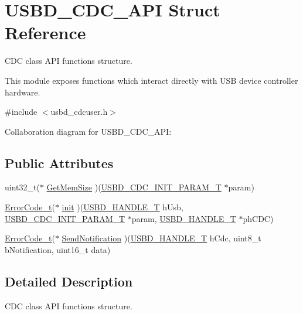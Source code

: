 \hypertarget{structUSBD__CDC__API}{}\section{U\+S\+B\+D\+\_\+\+C\+D\+C\+\_\+\+A\+PI Struct Reference}
\label{structUSBD__CDC__API}


C\+DC class A\+PI functions structure.

This module exposes functions which interact directly with U\+SB device controller hardware.  




{\ttfamily \#include $<$usbd\+\_\+cdcuser.\+h$>$}



Collaboration diagram for U\+S\+B\+D\+\_\+\+C\+D\+C\+\_\+\+A\+PI\+:
\subsection*{Public Attributes}
\begin{DoxyCompactItemize}
\item 
uint32\+\_\+t($\ast$ \hyperlink{structUSBD__CDC__API_abde21c25f0b02b4d3ec9af0e41378437}{Get\+Mem\+Size} )(\hyperlink{group__USBD__CDC_ga78b2c5f20653181161c59062795233b3}{U\+S\+B\+D\+\_\+\+C\+D\+C\+\_\+\+I\+N\+I\+T\+\_\+\+P\+A\+R\+A\+M\+\_\+T} $\ast$param)
\item 
\hyperlink{error_8h_a905255056c349318139d94aa4523d516}{Error\+Code\+\_\+t}($\ast$ \hyperlink{structUSBD__CDC__API_a3c3f8725643c607bca1cf3f422dc5702}{init} )(\hyperlink{group__USBD__Core_gafdbb2204d929cb9d75736bd2b42342ac}{U\+S\+B\+D\+\_\+\+H\+A\+N\+D\+L\+E\+\_\+T} h\+Usb, \hyperlink{group__USBD__CDC_ga78b2c5f20653181161c59062795233b3}{U\+S\+B\+D\+\_\+\+C\+D\+C\+\_\+\+I\+N\+I\+T\+\_\+\+P\+A\+R\+A\+M\+\_\+T} $\ast$param, \hyperlink{group__USBD__Core_gafdbb2204d929cb9d75736bd2b42342ac}{U\+S\+B\+D\+\_\+\+H\+A\+N\+D\+L\+E\+\_\+T} $\ast$ph\+C\+DC)
\item 
\hyperlink{error_8h_a905255056c349318139d94aa4523d516}{Error\+Code\+\_\+t}($\ast$ \hyperlink{structUSBD__CDC__API_a39f1af8073c7e98a7a96ac68e612e7fe}{Send\+Notification} )(\hyperlink{group__USBD__Core_gafdbb2204d929cb9d75736bd2b42342ac}{U\+S\+B\+D\+\_\+\+H\+A\+N\+D\+L\+E\+\_\+T} h\+Cdc, uint8\+\_\+t b\+Notification, uint16\+\_\+t data)
\end{DoxyCompactItemize}


\subsection{Detailed Description}
C\+DC class A\+PI functions structure.

